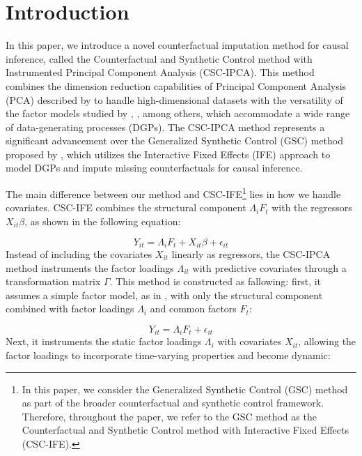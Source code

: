 \documentclass[12pt]{article}
\begin{document}
\pagebreak \newpage
\doublespacing

\section{Introduction} 
\label{sec: introduction}
In this paper, we introduce a novel counterfactual imputation method for causal inference, called the Counterfactual and Synthetic Control method with Instrumented Principal Component Analysis (CSC-IPCA). This method combines the dimension reduction capabilities of Principal Component Analysis (PCA) described by \cite{jollife2016principal} to handle high-dimensional datasets with the versatility of the factor models studied by \cite{bai2003computation}, \cite{bai2009panel}, among others, which accommodate a wide range of data-generating processes (DGPs). The CSC-IPCA method represents a significant advancement over the Generalized Synthetic Control (GSC) method proposed by \cite{xu2017generalized}, which utilizes the Interactive Fixed Effects (IFE) approach to model DGPs and impute missing counterfactuals for causal inference.

The main difference between our method and CSC-IFE\footnote{In this paper, we consider the Generalized Synthetic Control (GSC) method as part of the broader counterfactual and synthetic control framework. Therefore, throughout the paper, we refer to the GSC method as the Counterfactual and Synthetic Control method with Interactive Fixed Effects (CSC-IFE).} lies in how we handle covariates. CSC-IFE combines the structural component $\Lambda_i F_t$ with the regressors $X_{it} \beta$, as shown in the following equation:

\begin{equation}
\label{eqn: ife}
Y_{it} = \Lambda_i F_t + X_{it} \beta + \epsilon_{it}
\end{equation}
Instead of including the covariates $X_{it}$ linearly as regressors, the CSC-IPCA method instruments the factor loadings $\Lambda_{it}$ with predictive covariates through a transformation matrix $\Gamma$. This method is constructed as fallowing: first, it assumes a simple factor model, as in \cite{bai2003computation}, with only the structural component combined with factor loadings $\Lambda_i$ and common factors $F_t$:

\begin{equation}
    \label{eqn: fe}
    Y_{it} = \Lambda_i F_t + \epsilon_{it}
    \end{equation}
    Next, it instruments the static factor loadings $\Lambda_i$ with covariates $X_{it}$, allowing the factor loadings to incorporate time-varying properties and become dynamic:
    
\end{document}
